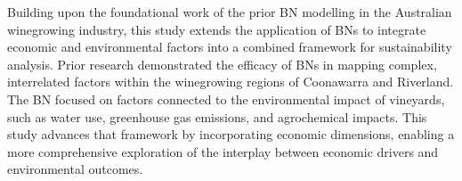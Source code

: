 \documentclass{article}
\begin{document}

Building upon the foundational work of the prior BN modelling in the Australian winegrowing industry, this study extends the application of BNs to integrate economic and environmental factors into a combined framework for sustainability analysis. Prior research demonstrated the efficacy of BNs in mapping complex, interrelated factors within the winegrowing regions of Coonawarra and Riverland. The BN focused on factors connected to the environmental impact of vineyards, such as water use, greenhouse gas emissions, and agrochemical impacts. This study advances that framework by incorporating economic dimensions, enabling a more comprehensive exploration of the interplay between economic drivers and environmental outcomes.


\end{document}
